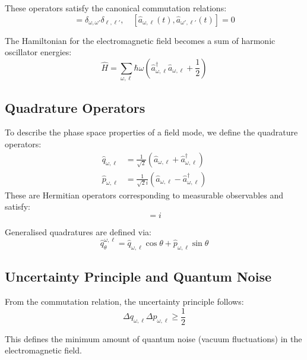 These operators satisfy the canonical commutation relations:
\begin{equation}
[\hat{a}_{\omega,\ell}(t), \hat{a}_{\omega',\ell'}^\dagger(t)] = \delta_{\omega,\omega'}\delta_{\ell,\ell'}, \quad [\hat{a}_{\omega,\ell}(t), \hat{a}_{\omega',\ell'}(t)] = 0
\end{equation}

The Hamiltonian for the electromagnetic field becomes a sum of harmonic oscillator energies:
\begin{equation}
\hat{H} = \sum_{\omega,\ell} \hbar \omega \left( \hat{a}_{\omega,\ell}^\dagger \hat{a}_{\omega,\ell} + \frac{1}{2} \right)
\end{equation}

\subsection*{Quadrature Operators}

To describe the phase space properties of a field mode, we define the quadrature operators:
\begin{align}
\hat{q}_{\omega,\ell} &= \frac{1}{\sqrt{2}}(\hat{a}_{\omega,\ell} + \hat{a}_{\omega,\ell}^\dagger) \\
\hat{p}_{\omega,\ell} &= \frac{1}{\sqrt{2}i}(\hat{a}_{\omega,\ell} - \hat{a}_{\omega,\ell}^\dagger)
\end{align}
These are Hermitian operators corresponding to measurable observables and satisfy:
\begin{equation}
[\hat{q}_{\omega,\ell}, \hat{p}_{\omega,\ell}] = i
\end{equation}

Generalised quadratures are defined via:
\begin{equation}
\hat{q}_{\theta}^{\omega,\ell} = \hat{q}_{\omega,\ell} \cos\theta + \hat{p}_{\omega,\ell} \sin\theta
\end{equation}

\subsection*{Uncertainty Principle and Quantum Noise}

From the commutation relation, the uncertainty principle follows:
\begin{equation}
\Delta q_{\omega,\ell} \Delta p_{\omega,\ell} \geq \frac{1}{2}
\end{equation}

This defines the minimum amount of quantum noise (vacuum fluctuations) in the electromagnetic field.

